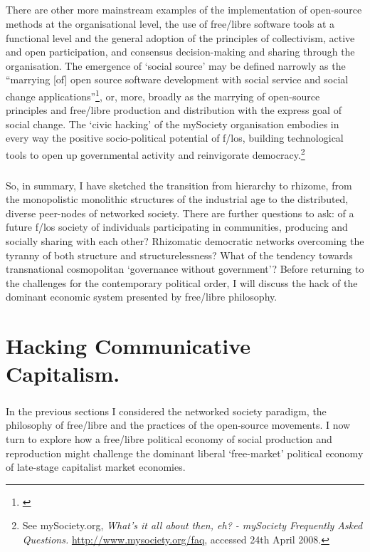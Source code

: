 \documentclass[11pt,titlepage]{book}
\begin{document}
\paragraph{}There are other more mainstream examples of the implementation of open-source methods at the organisational level, the use of free/libre software tools at a functional level and the general adoption of the principles of collectivism, active and open participation, and consensus decision-making and sharing through the organisation. The emergence of `social source' may be defined narrowly as the ``marrying [of] open source software development with social service and social change applications''\footnote{\cite{rosenblatt:2005mn}}, or, more, broadly as the marrying of open-source principles and free/libre production and distribution with the express goal of social change. The `civic hacking' of the mySociety organisation embodies in every way the positive socio-political potential of f/los, building technological tools to open up governmental activity and reinvigorate democracy.\footnote{See mySociety.org, \textit{What's it all about then, eh? - mySociety Frequently Asked Questions.} \url{http://www.mysociety.org/faq}, accessed 24th April 2008.}

\paragraph{}So, in summary, I have sketched the transition from hierarchy to rhizome, from the monopolistic monolithic structures of the industrial age to the distributed, diverse peer-nodes of networked society. There are further questions to ask: of a future f/los society of individuals participating in communities, producing and socially sharing with each other? Rhizomatic democratic networks overcoming the tyranny of both structure and structurelessness? What of the tendency towards transnational cosmopolitan `governance without government'? Before returning to the challenges for the contemporary political order, I will discuss the hack of the dominant economic system presented by free/libre philosophy.\newpage
\chapter{Hacking Communicative Capitalism.}
\paragraph{}In the previous sections I considered the networked society paradigm, the philosophy of free/libre and the practices of the open-source movements. I now turn to explore how a free/libre political economy of social production and reproduction might challenge the dominant liberal `free-market' political economy of late-stage capitalist market economies.
\end{document}

